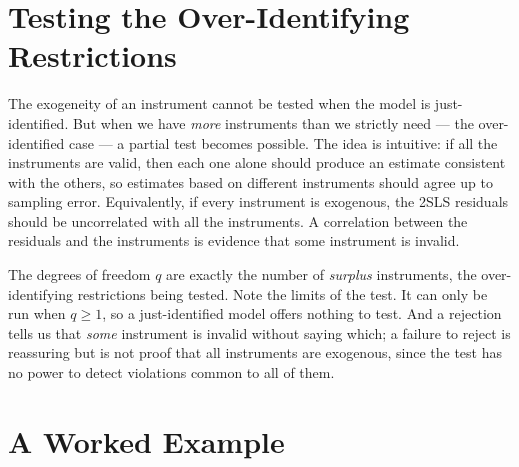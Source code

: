 \section{Testing the Over-Identifying Restrictions}
\label{sec:sargan}

The exogeneity of an instrument cannot be tested when the model is just-identified. But when we have \emph{more} instruments than we strictly need --- the over-identified case --- a partial test becomes possible. The idea is intuitive: if all the instruments are valid, then each one alone should produce an estimate consistent with the others, so estimates based on different instruments should agree up to sampling error. Equivalently, if every instrument is exogenous, the 2SLS residuals should be uncorrelated with all the instruments. A correlation between the residuals and the instruments is evidence that some instrument is invalid.


The degrees of freedom $q$ are exactly the number of \emph{surplus} instruments, the over-identifying restrictions being tested. Note the limits of the test. It can only be run when $q\geq 1$, so a just-identified model offers nothing to test. And a rejection tells us that \emph{some} instrument is invalid without saying which; a failure to reject is reassuring but is not proof that all instruments are exogenous, since the test has no power to detect violations common to all of them.

\section{A Worked Example}

